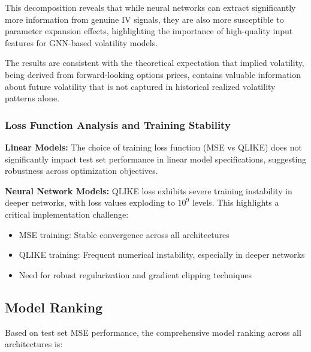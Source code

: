 \documentclass[12pt,a4paper]{article}
\begin{document}
This decomposition reveals that while neural networks can extract significantly more information from genuine IV signals, they are also more susceptible to parameter expansion effects, highlighting the importance of high-quality input features for GNN-based volatility models.

The results are consistent with the theoretical expectation that implied volatility, being derived from forward-looking options prices, contains valuable information about future volatility that is not captured in historical realized volatility patterns alone.

\subsubsection{Loss Function Analysis and Training Stability}

\textbf{Linear Models:} The choice of training loss function (MSE vs QLIKE) does not significantly impact test set performance in linear model specifications, suggesting robustness across optimization objectives.

\textbf{Neural Network Models:} QLIKE loss exhibits severe training instability in deeper networks, with loss values exploding to $10^9$ levels. This highlights a critical implementation challenge:

\begin{itemize}
\item MSE training: Stable convergence across all architectures
\item QLIKE training: Frequent numerical instability, especially in deeper networks
\item Need for robust regularization and gradient clipping techniques
\end{itemize}

\subsection{Model Ranking}

Based on test set MSE performance, the comprehensive model ranking across all architectures is:
\end{document}
